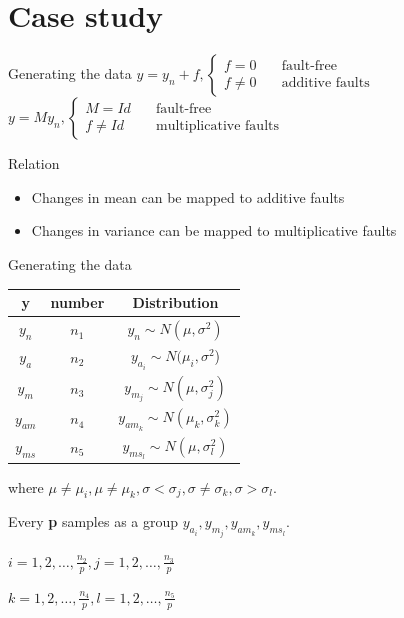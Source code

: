 \documentclass[10pt]{beamer}
\begin{document}
\section{Case study}
\begin{frame}{Generating the data}
    $y = y_n + f, \left\{ \begin{aligned}
    f = 0      \quad &\text{fault-free} \\
    f \neq 0   \quad &\text{additive faults}
     \end{aligned} 
     \right. $
   $y = My_n,\left\{ \begin{aligned}
    M = Id     \quad &\text{fault-free} \\
    f \neq Id   \quad &\text{multiplicative faults}
     \end{aligned} 
     \right. $
      \begin{exampleblock}{Relation}
	\begin{itemize}
    \item Changes in mean can be mapped to additive faults
    \item Changes in variance can be mapped to multiplicative faults
    \end{itemize}
    \end{exampleblock}
    
\end{frame}
\begin{frame}{Generating the data}
\begin{center}
\begin{tabular}{ccc}
\hline
y& number& Distribution                                    \\
\hline
$y_n  $ &$n_1$& $y_n \sim N(\mu, \sigma^2)$                \\
$y_a  $ &$n_2$& $y_{a_i} \sim N(\mu_i,\sigma^2$)           \\
$y_m  $ &$n_3$& $y_{m_j} \sim N(\mu,\sigma_j^2)$           \\
$y_{am}$&$n_4$& $y_{am_k}\sim N(\mu_k,\sigma_k^2)$         \\
$y_{ms}$ &$n_5$& $y_{ms_l} \sim N(\mu,\sigma_l^2)$  \\
\hline
\end{tabular}
\end{center}
where $\mu \neq \mu_i,\mu \neq \mu_k,\sigma < \sigma_j,\sigma \neq \sigma_k,\sigma > \sigma_l$. \par Every \textbf{p} samples as a group
$y_{a_i},y_{m_j},y_{am_k},y_{ms_l}$. \par $i = 1,2,\dots,\frac{n_2}{p},j=1,2,\dots,\frac{n_3}{p}$ \par
$k = 1,2,\dots,\frac{n_4}{p},l = 1,2,\dots, \frac{n_5}{p}$
\end{frame}
\end{document}
